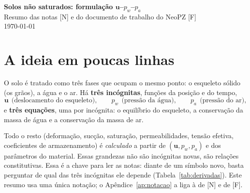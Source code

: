 \documentclass[11pt,a4paper]{article}
\newcommand{\vu}{\bm u}
\begin{document}
\begin{center}
{\Large\bfseries Solos não saturados: formulação $\vu$--$p_w$--$p_a$}\\[4pt]
{\normalsize Resumo das notas [N] e do documento de trabalho do NeoPZ [F]}\\[2pt]
{\small \today}
\end{center}

\section{A ideia em poucas linhas}

O solo é tratado como três fases que ocupam o mesmo ponto: o esqueleto sólido
(os grãos), a água e o ar. Há \textbf{três incógnitas}, funções da posição e do tempo,
\[
\vu\ \ \text{(deslocamento do esqueleto)},\qquad
p_w\ \ \text{(pressão da água)},\qquad
p_a\ \ \text{(pressão do ar)},
\]
e \textbf{três equações}, uma por incógnita: o equilíbrio do esqueleto, a
conservação da massa de água e a conservação da massa de ar.

Todo o resto (deformação, sucção, saturação, permeabilidades, tensão efetiva,
coeficientes de armazenamento) é \emph{calculado} a partir de $(\vu,p_w,p_a)$ e
dos parâmetros do material. Essas grandezas não são incógnitas novas, são relações
constitutivas. Essa é a chave para ler as notas: diante de um símbolo novo, basta
perguntar de qual das três incógnitas ele depende (Tabela~\ref{tab:derivadas}).
Este resumo usa uma única notação; o Apêndice~\ref{ap:notacao} a liga à de [N] e de [F].
\end{document}
